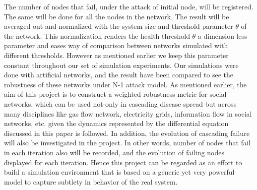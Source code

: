 \documentclass[11pt]{article}
\begin{document}
The number of nodes that fail, under the attack of initial node, will be registered. The same will be done for all the nodes in the network. The result will be averaged out and normalized with the system size and threshold parameter $\theta$ of the network. This normalization renders the health threshold $\theta$ a dimension less parameter and eases way of comparison between networks simulated with different thresholds. However as mentioned earlier we keep this parameter constant throughout our set of simulation experiments. Our simulations were done with artificial networks, and the result have been compared to see the robustness of these networks under N-1 attack model. As mentioned earlier, the aim of this project is to construct a weighted robustness metric for social networks, which can be used not-only in cascading disease spread but across many disciplines like gas flow network, electricity grids, information flow in social networks, etc. given the dynamics represented by the differential equation discussed in this paper is followed. In addition, the evolution of cascading failure will also be investigated in the project. In other words, number of nodes that fail in each iteration also will be recorded, and the evolution of failing nodes displayed for each iteration. Hence this project can be regarded as an effort to build a simulation environment that is based on a generic yet very powerful model to capture subtlety in behavior of the real system.
\end{document}
